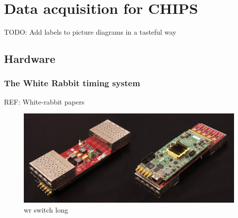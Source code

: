 \chapter{Data acquisition for CHIPS} %
\label{chap:daq} %

TODO: Add labels to picture diagrams in a tasteful way

\section{Hardware} %
\label{sec:daq_hard} %

\subsection{The White Rabbit timing system} %
\label{sec:daq_hard_timing} %

REF: White-rabbit papers

\begin{figure} %
    \includegraphics[width=\textwidth]{diagrams/6-daq/wr_switch.jpg}
    \caption[wr switch short]
    {wr switch long}
    \label{fig:wr_switch}
\end{figure}


